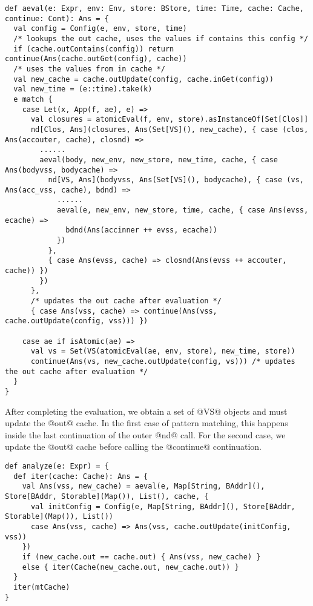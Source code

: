 \documentclass[acmsmall]{acmart}\settopmatter{}
\begin{document}
\begin{lstlisting}
def aeval(e: Expr, env: Env, store: BStore, time: Time, cache: Cache, continue: Cont): Ans = {
  val config = Config(e, env, store, time)
  /* lookups the out cache, uses the values if contains this config */
  if (cache.outContains(config)) return continue(Ans(cache.outGet(config), cache))
  /* uses the values from in cache */
  val new_cache = cache.outUpdate(config, cache.inGet(config))
  val new_time = (e::time).take(k)
  e match {
    case Let(x, App(f, ae), e) =>
      val closures = atomicEval(f, env, store).asInstanceOf[Set[Clos]]
      nd[Clos, Ans](closures, Ans(Set[VS](), new_cache), { case (clos, Ans(accouter, cache), closnd) =>
        ......
        aeval(body, new_env, new_store, new_time, cache, { case Ans(bodyvss, bodycache) =>
          nd[VS, Ans](bodyvss, Ans(Set[VS](), bodycache), { case (vs, Ans(acc_vss, cache), bdnd) =>
            ......
            aeval(e, new_env, new_store, time, cache, { case Ans(evss, ecache) =>
              bdnd(Ans(accinner ++ evss, ecache))
            })
          },
          { case Ans(evss, cache) => closnd(Ans(evss ++ accouter, cache)) })
        })
      },
      /* updates the out cache after evaluation */
      { case Ans(vss, cache) => continue(Ans(vss, cache.outUpdate(config, vss))) })

    case ae if isAtomic(ae) =>
      val vs = Set(VS(atomicEval(ae, env, store), new_time, store))
      continue(Ans(vs, new_cache.outUpdate(config, vs))) /* updates the out cache after evaluation */
  }
}
\end{lstlisting}

After completing the evaluation, we obtain a set of @VS@ objects and must update the @out@ cache.
In the first case of pattern matching, this happens inside the last continuation of the
outer @nd@ call.
For the second case, we update the @out@ cache before calling the @continue@ continuation.

\begin{lstlisting}
def analyze(e: Expr) = {
  def iter(cache: Cache): Ans = {
    val Ans(vss, new_cache) = aeval(e, Map[String, BAddr](), Store[BAddr, Storable](Map()), List(), cache, {
      val initConfig = Config(e, Map[String, BAddr](), Store[BAddr, Storable](Map()), List())
      case Ans(vss, cache) => Ans(vss, cache.outUpdate(initConfig, vss))
    })
    if (new_cache.out == cache.out) { Ans(vss, new_cache) }
    else { iter(Cache(new_cache.out, new_cache.out)) }
  }
  iter(mtCache)
}
\end{lstlisting}
\end{document}
